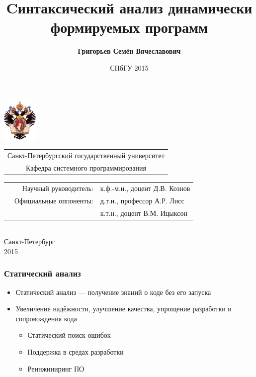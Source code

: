 \documentclass{beamer}
\title[]{Cинтаксический анализ динамически формируемых программ}
\author[Григорьев Семён]{{\bfseries Григорьев Семён Вячеславович}}
\begin{document}
{

\begin{frame}
\includegraphics[width=1.7cm]{SPbGU_Logo.png}
\vspace{-40pt}
\hspace{-10pt}
\begin{center}
   \begin{tabular}{c}
        \scriptsize{Санкт-Петербургский государственный университет} \\
        \scriptsize{Кафедра системного программирования}
    \end{tabular}

\titlepage
\vspace{-10pt}
{\scriptsize
 {
 \begin{tabular} {p{3.5cm} r l} 
  &{Научный руководитель:}  & к.ф.-м.н., доцент Д.В. Кознов \\ 
  &{Официальные оппоненты:} & д.т.н., профессор  А.Р. Лисс \\ 
  &                         & к.т.н., доцент В.М. Ицыксон \\
 \end{tabular}
 }}
  \\
  \vspace{32pt}
  \scriptsize{Санкт-Петербург\\
                 2015}
  \end{center}
\end{frame}

\date{СПбГУ 2015}
}


\begin{frame}
    \transwipe[direction=90]
    \frametitle{Статический анализ}
    \begin{itemize}
        \item Статический анализ --- получение знаний о коде без его запуска
        \item Увеличение надёжности, улучшение качества, упрощение разработки и сопровождения кода
        \begin{itemize}
            \item Статический поиск ошибок
            \item Поддержка в средах разработки
            \item Реинжиниринг ПО
        \end{itemize}
    \end{itemize}
\end{frame}
\end{document}
